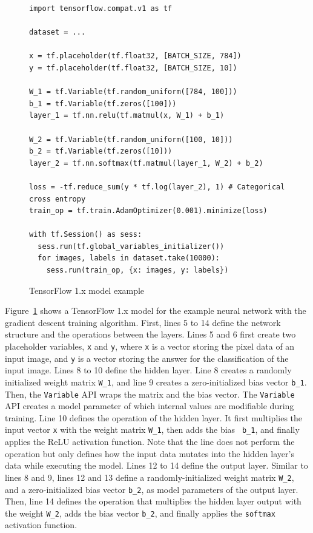 \begin{figure}[ht!]\centering
  \begin{lstlisting}[style=mpython]
import tensorflow.compat.v1 as tf

dataset = ...

x = tf.placeholder(tf.float32, [BATCH_SIZE, 784])
y = tf.placeholder(tf.float32, [BATCH_SIZE, 10]) 

W_1 = tf.Variable(tf.random_uniform([784, 100]))
b_1 = tf.Variable(tf.zeros([100]))
layer_1 = tf.nn.relu(tf.matmul(x, W_1) + b_1)

W_2 = tf.Variable(tf.random_uniform([100, 10]))
b_2 = tf.Variable(tf.zeros([10]))
layer_2 = tf.nn.softmax(tf.matmul(layer_1, W_2) + b_2)

loss = -tf.reduce_sum(y * tf.log(layer_2), 1) # Categorical cross entropy 
train_op = tf.train.AdamOptimizer(0.001).minimize(loss)

with tf.Session() as sess:
  sess.run(tf.global_variables_initializer())
  for images, labels in dataset.take(10000): 
    sess.run(train_op, {x: images, y: labels}) \end{lstlisting}
  \caption{TensorFlow 1.x model example}
\label{fig:back:tf1}
\end{figure}

Figure~\ref{fig:back:tf1} shows a TensorFlow 1.x model for the example neural
network with the gradient descent training algorithm.
First, lines 5 to 14 define the network structure and the operations
between the layers.
Lines 5 and 6 first create two placeholder variables, {\tt x} and {\tt y},
where {\tt x} is a vector storing the pixel data of an input image, and {\tt y}
is a vector storing the answer for the classification of the input image. 
Lines 8 to 10 define the hidden layer.
Line 8 creates a randomly initialized weight matrix {\tt W\_1}, and line 9
creates a zero-initialized bias vector {\tt b\_1}.
Then, the {\tt Variable} API wraps the matrix and the bias vector.
The {\tt Variable} API creates a model parameter of which internal values are
modifiable during training.
Line 10 defines the operation of the hidden layer. It first multiplies the
input vector {\tt x} with the weight matrix {\tt W\_1}, then adds the bias {\tt
b\_1}, and finally applies the ReLU activation function. 
Note that the line does not perform the operation but only defines how
the input data mutates into the hidden layer's data while executing the
model.
Lines 12 to 14 define the output layer.
Similar to lines 8 and 9, lines 12 and 13 define a randomly-initialized
weight matrix {\tt W\_2}, and a zero-initialized bias vector {\tt b\_2}, as
model parameters of the output layer.
Then, line 14 defines the operation that
multiplies the hidden layer output with
the weight {\tt W\_2}, adds the bias vector {\tt b\_2}, and finally applies the
{\tt softmax} activation function.



